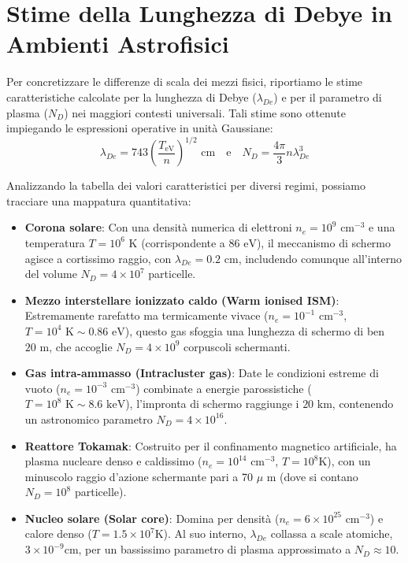 \section{Stime della Lunghezza di Debye in Ambienti Astrofisici}

Per concretizzare le differenze di scala dei mezzi fisici, riportiamo le stime caratteristiche calcolate per la lunghezza di Debye ($\lambda_{De}$) e per il parametro di plasma ($N_D$) nei maggiori contesti universali. Tali stime sono ottenute impiegando le espressioni operative in unità Gaussiane:
\begin{equation}
\lambda_{De} = 743 \left(\frac{T_{\text{eV}}}{n}\right)^{1/2} \text{ cm} \quad \text{e} \quad N_D = \frac{4\pi}{3} n \lambda_{De}^3
\end{equation}

Analizzando la tabella dei valori caratteristici per diversi regimi, possiamo tracciare una mappatura quantitativa:
\begin{itemize}
\item \textbf{Corona solare}: Con una densità numerica di elettroni $n_e = 10^9 \text{ cm}^{-3}$ e una temperatura $T = 10^6 \text{ K}$ (corrispondente a $86 \text{ eV}$), il meccanismo di schermo agisce a cortissimo raggio, con $\lambda_{De} = 0.2 \text{ cm}$, includendo comunque all'interno del volume $N_D = 4 \times 10^7$ particelle.
\item \textbf{Mezzo interstellare ionizzato caldo (Warm ionised ISM)}: Estremamente rarefatto ma termicamente vivace ($n_e = 10^{-1} \text{ cm}^{-3}$, $T = 10^4 \text{ K} \sim 0.86 \text{ eV}$), questo gas sfoggia una lunghezza di schermo di ben $20 \text{ m}$, che accoglie $N_D = 4 \times 10^9$ corpuscoli schermanti.
\item \textbf{Gas intra-ammasso (Intracluster gas)}: Date le condizioni estreme di vuoto ($n_e = 10^{-3} \text{ cm}^{-3}$) combinate a energie parossistiche ($T = 10^8 \text{ K} \sim 8.6 \text{ keV}$), l'impronta di schermo raggiunge i $20 \text{ km}$, contenendo un astronomico parametro $N_D = 4 \times 10^{16}$.
\item \textbf{Reattore Tokamak}: Costruito per il confinamento magnetico artificiale, ha plasma nucleare denso e caldissimo ($n_e = 10^{14} \text{ cm}^{-3}$, $T = 10^8 \text{K}$), con un minuscolo raggio d'azione schermante pari a 70 $\mu$ m (dove si contano $N_D = 10^8$ particelle).
\item \textbf{Nucleo solare (Solar core)}: Domina per densità ($n_e = 6 \times 10^{25} \text{ cm}^{-3}$) e calore denso ($T = 1.5 \times 10^7 \text{K}$). Al suo interno, $\lambda_{De}$ collassa a scale atomiche, $3 \times 10^{-9} \text{cm}$, per un bassissimo parametro di plasma approssimato a $N_D \approx 10$.
\end{itemize}

